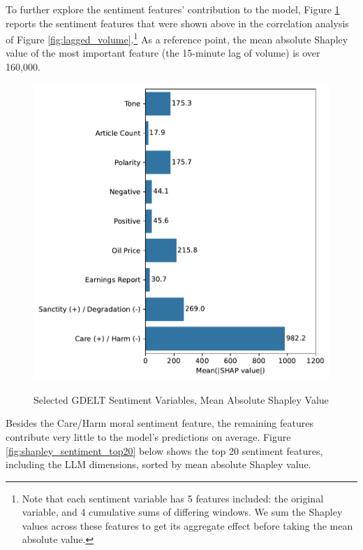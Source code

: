 \documentclass[12pt]{article}
\begin{document}
To further explore the sentiment features' contribution to the model, Figure \ref{fig:shapley_sentiment} reports the sentiment features that were shown above in the correlation analysis of Figure \ref{fig:lagged_volume}.\footnote{Note that each sentiment variable has 5 features included: the original variable, and 4 cumulative sums of differing windows. We sum the Shapley values across these features to get its aggregate effect before taking the mean absolute value.} As a reference point, the mean absolute Shapley value of the most important feature (the 15-minute lag of volume) is over 160,000.
\begin{figure}[H]
    \centering
    \caption{Selected GDELT Sentiment Variables, Mean Absolute Shapley Value}
    \includegraphics[width=0.75\linewidth]{../Output/shap_abs_sentiment.pdf}
    \label{fig:shapley_sentiment}
\end{figure}
Besides the Care/Harm moral sentiment feature, the remaining features contribute very little to the model's predictions on average. Figure \ref{fig:shapley_sentiment_top20} below shows the top 20 sentiment features, including the LLM dimensions, sorted by mean absolute Shapley value.
\end{document}
